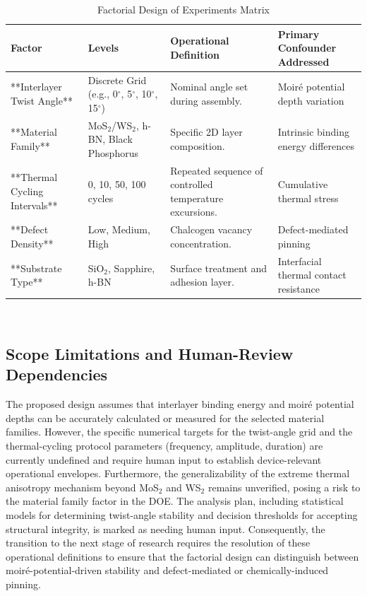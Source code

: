 \documentclass[conference]{IEEEtran}
\begin{document}
\begin{table}[htbp]
\centering
\footnotesize
\setlength{\tabcolsep}{3pt}
\renewcommand{\arraystretch}{1.12}
\caption{Factorial Design of Experiments Matrix}
\label{tab:materials-and-characterization-doe-matrix}
\begin{tabular}{|p{}|p{}|p{}|p{}|}
\hline
Factor & Levels & Operational Definition & Primary Confounder Addressed \\\hline
**Interlayer Twist Angle** & Discrete Grid (e.g., 0$^\circ$, 5$^\circ$, 10$^\circ$, 15$^\circ$) & Nominal angle set during assembly. & Moiré potential depth variation \\\hline
**Material Family** & MoS$_{2}$/WS$_{2}$, h-BN, Black Phosphorus & Specific 2D layer composition. & Intrinsic binding energy differences \\\hline
**Thermal Cycling Intervals** & 0, 10, 50, 100 cycles & Repeated sequence of controlled temperature excursions. & Cumulative thermal stress \\\hline
**Defect Density** & Low, Medium, High & Chalcogen vacancy concentration. & Defect-mediated pinning \\\hline
**Substrate Type** & SiO$_{2}$, Sapphire, h-BN & Surface treatment and adhesion layer. & Interfacial thermal contact resistance \\\hline
\end{tabular}
\end{table}~\cite{cite_26ecaf73d88dfe33,cite_b9cc1fcb55e94349}

\subsection{Scope Limitations and Human-Review Dependencies}
The proposed design assumes that interlayer binding energy and moiré potential depths can be accurately calculated or measured for the selected material families. However, the specific numerical targets for the twist-angle grid and the thermal-cycling protocol parameters (frequency, amplitude, duration) are currently undefined and require human input to establish device-relevant operational envelopes. Furthermore, the generalizability of the extreme thermal anisotropy mechanism beyond MoS$_{2}$ and WS$_{2}$ remains unverified, posing a risk to the material family factor in the DOE. The analysis plan, including statistical models for determining twist-angle stability and decision thresholds for accepting structural integrity, is marked as needing human input. Consequently, the transition to the next stage of research requires the resolution of these operational definitions to ensure that the factorial design can distinguish between moiré-potential-driven stability and defect-mediated or chemically-induced pinning.~\cite{cite_26ecaf73d88dfe33}
\end{document}

